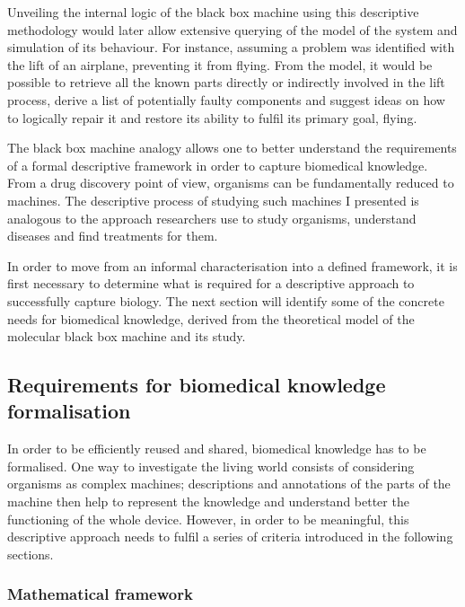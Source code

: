 Unveiling the internal logic of the black box machine using this descriptive methodology would later allow extensive querying of the model of the system and simulation of its behaviour. For instance, assuming a problem was identified with the lift of an airplane, preventing it from flying. From the model, it would be possible to retrieve all the known parts directly or indirectly involved in the lift process, derive a list of potentially faulty components and suggest ideas on how to logically repair it and restore its ability to fulfil its primary goal, flying.

The black box machine analogy allows one to better understand the requirements of a formal descriptive framework in order to capture biomedical knowledge. From a drug discovery point of view, organisms can be fundamentally reduced to machines. The descriptive process of studying such machines I presented is analogous to the approach researchers use to study organisms, understand diseases and find treatments for them.

In order to move from an informal characterisation into a defined framework, it is first necessary to determine what is required for a descriptive approach to successfully capture biology. The next section will identify some of the concrete needs for biomedical knowledge, derived from the theoretical model of the molecular black box machine and its study.

\subsection{Requirements for biomedical knowledge formalisation}

In order to be efficiently reused and shared, biomedical knowledge has to be formalised. One way to investigate the living world consists of considering organisms as complex machines; descriptions and annotations of the parts of the machine then help to represent the knowledge and understand better the functioning of the whole device. However, in order to be meaningful, this descriptive approach needs to fulfil a series of criteria introduced in the following sections.

\subsubsection{Mathematical framework}
\label{reqmath}

